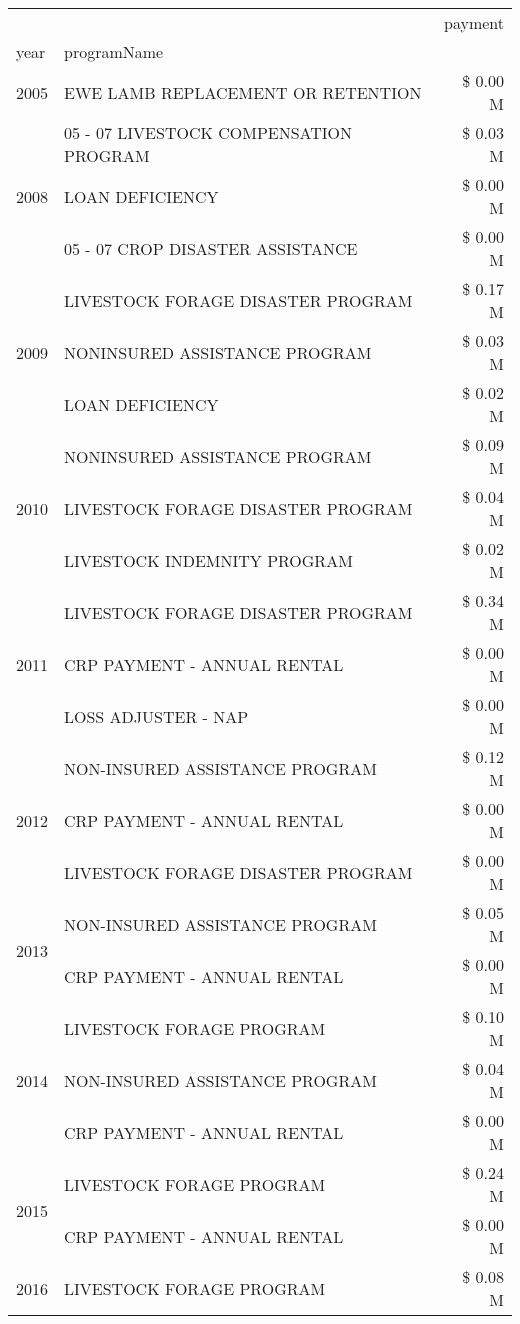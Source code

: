 \begin{tabular}{llr}
\toprule
 &  & payment \\
year & programName &  \\
\midrule
2005 & EWE LAMB REPLACEMENT OR RETENTION & \$ 0.00 M \\
\cline{1-3}
\multirow[t]{3}{*}{2008} & 05 - 07 LIVESTOCK COMPENSATION PROGRAM & \$ 0.03 M \\
 & LOAN DEFICIENCY & \$ 0.00 M \\
 & 05 - 07 CROP DISASTER ASSISTANCE & \$ 0.00 M \\
\cline{1-3}
\multirow[t]{3}{*}{2009} & LIVESTOCK FORAGE DISASTER  PROGRAM & \$ 0.17 M \\
 & NONINSURED ASSISTANCE PROGRAM & \$ 0.03 M \\
 & LOAN DEFICIENCY & \$ 0.02 M \\
\cline{1-3}
\multirow[t]{3}{*}{2010} & NONINSURED ASSISTANCE PROGRAM & \$ 0.09 M \\
 & LIVESTOCK FORAGE DISASTER PROGRAM & \$ 0.04 M \\
 & LIVESTOCK INDEMNITY PROGRAM & \$ 0.02 M \\
\cline{1-3}
\multirow[t]{3}{*}{2011} & LIVESTOCK FORAGE DISASTER PROGRAM & \$ 0.34 M \\
 & CRP PAYMENT - ANNUAL RENTAL & \$ 0.00 M \\
 & LOSS ADJUSTER - NAP & \$ 0.00 M \\
\cline{1-3}
\multirow[t]{3}{*}{2012} & NON-INSURED ASSISTANCE PROGRAM & \$ 0.12 M \\
 & CRP PAYMENT - ANNUAL RENTAL & \$ 0.00 M \\
 & LIVESTOCK FORAGE DISASTER PROGRAM & \$ 0.00 M \\
\cline{1-3}
\multirow[t]{2}{*}{2013} & NON-INSURED ASSISTANCE PROGRAM & \$ 0.05 M \\
 & CRP PAYMENT - ANNUAL RENTAL & \$ 0.00 M \\
\cline{1-3}
\multirow[t]{3}{*}{2014} & LIVESTOCK FORAGE PROGRAM & \$ 0.10 M \\
 & NON-INSURED ASSISTANCE PROGRAM & \$ 0.04 M \\
 & CRP PAYMENT - ANNUAL RENTAL & \$ 0.00 M \\
\cline{1-3}
\multirow[t]{2}{*}{2015} & LIVESTOCK FORAGE PROGRAM & \$ 0.24 M \\
 & CRP PAYMENT - ANNUAL RENTAL & \$ 0.00 M \\
\cline{1-3}
\multirow[t]{3}{*}{2016} & LIVESTOCK FORAGE PROGRAM & \$ 0.08 M \\

\end{tabular}
